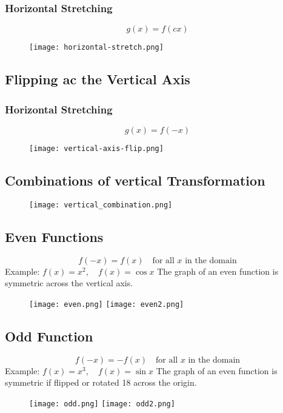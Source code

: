 \subsubsection{Horizontal Stretching}
\[g(x) = f(cx)\]
\begin{figure}[h]
  \centering
  \texttt{[image: horizontal-stretch.png]}
\end{figure}

\subsection{Flipping ac the Vertical Axis}
\subsubsection{Horizontal Stretching}
\[g(x) = f(-x)\]
\begin{figure}[h]
  \centering
  \texttt{[image: vertical-axis-flip.png]}
\end{figure}

\subsection{Combinations of vertical Transformation}
\begin{figure}[h]
  \centering
  \texttt{[image: vertical\_combination.png]}
\end{figure}

\subsection{Even Functions}
\[ f(-x) = f(x) \quad \text{for all } x \text{ in the domain} \]
Example: \( f(x) = x^2, \quad f(x) = \cos x \)
The graph of an even function is symmetric across the vertical axis.
\begin{figure}
\centering
\texttt{[image: even.png]}
\texttt{[image: even2.png]}
\end{figure}

\subsection{Odd Function}
\[ f(-x) = -f(x) \quad \text{for all } x \text{ in the domain} \]
Example: \( f(x) = x^3, \quad f(x) = \sin x \)
The graph of an even function is symmetric if flipped or rotated 18 across the origin.
\begin{figure}
\centering
\texttt{[image: odd.png]}
\texttt{[image: odd2.png]}
\end{figure}

